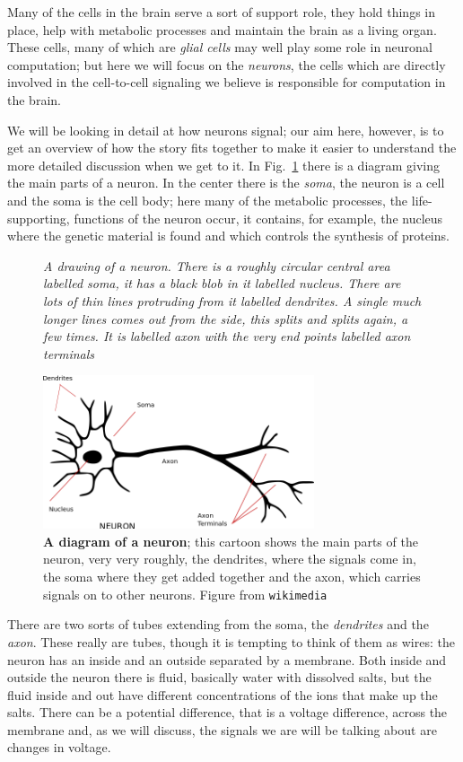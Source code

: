 \documentclass[12pt]{article}
\begin{document}
Many of the cells in the brain serve a sort of support role, they hold
things in place, help with metabolic processes and maintain the brain
as a living organ. These cells, many of which are \textsl{glial cells}
may well play some role in neuronal computation; but here we will
focus on the \textsl{neurons}, the cells which are directly involved
in the cell-to-cell signaling we believe is responsible for
computation in the brain.

We will be looking in detail at how neurons signal; our aim here,
however, is to get an overview of how the story fits together to make
it easier to understand the more detailed discussion when we get to
it. In Fig.~\ref{fig_neuron} there is a diagram giving the main parts
of a neuron. In the center there is the \textsl{soma}, the neuron is a
cell and the soma is the cell body; here many of the metabolic
processes, the life-supporting, functions of the neuron occur, it
contains, for example, the nucleus where the genetic material is found
and which controls the synthesis of proteins.

\begin{figure}[tbhp]
{\textsl{A drawing of a neuron. There is a roughly circular central area labelled soma, it has a black blob in it labelled nucleus. There are lots of thin lines protruding from it labelled dendrites. A single much longer lines comes out from the side, this splits and splits again, a few times. It is labelled axon with the very end points labelled axon terminals}}
{
  \begin{center}
  \includegraphics[width=8cm]{neuron.png}
  \end{center}
}
\caption{\textbf{A diagram of a neuron}; this cartoon shows the main parts of the neuron, very very roughly, the dendrites, where the signals come in, the soma where they get added together and the axon, which carries signals on to other neurons. Figure from \texttt{wikimedia}\label{fig_neuron}}
\end{figure}

There are two sorts of tubes extending from the soma, the
\textsl{dendrites} and the \textsl{axon}. These really are tubes,
though it is tempting to think of them as wires: the neuron has an
inside and an outside separated by a membrane. Both inside and outside
the neuron there is fluid, basically water with dissolved salts, but
the fluid inside and out have different concentrations of the ions
that make up the salts. There can be a potential difference, that is a
voltage difference, across the membrane and, as we will discuss, the
signals we are will be talking about are changes in voltage.
\end{document}
